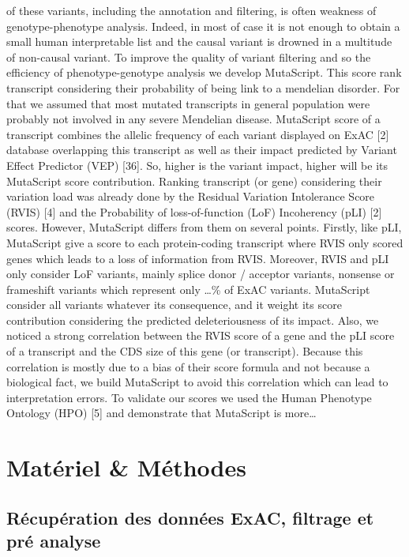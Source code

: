 \documentclass[12pt,twoside]{reedthesis}
\theoremstyle{definition}
\theoremstyle{definition}
\theoremstyle{remark}
\begin{document}
  of these variants, including the annotation and filtering, is often
  weakness of genotype-phenotype analysis. Indeed, in most of case it is
  not enough to obtain a small human interpretable list and the causal
  variant is drowned in a multitude of non-causal variant. To improve the
  quality of variant filtering and so the efficiency of phenotype-genotype
  analysis we develop MutaScript. This score rank transcript considering
  their probability of being link to a mendelian disorder. For that we
  assumed that most mutated transcripts in general population were
  probably not involved in any severe Mendelian disease. MutaScript score
  of a transcript combines the allelic frequency of each variant displayed
  on ExAC {[}2{]} database overlapping this transcript as well as their
  impact predicted by Variant Effect Predictor (VEP) {[}36{]}. So, higher
  is the variant impact, higher will be its MutaScript score contribution.
  Ranking transcript (or gene) considering their variation load was
  already done by the Residual Variation Intolerance Score (RVIS) {[}4{]}
  and the Probability of loss-of-function (LoF) Incoherency (pLI) {[}2{]}
  scores. However, MutaScript differs from them on several points.
  Firstly, like pLI, MutaScript give a score to each protein-coding
  transcript where RVIS only scored genes which leads to a loss of
  information from RVIS. Moreover, RVIS and pLI only consider LoF
  variants, mainly splice donor / acceptor variants, nonsense or
  frameshift variants which represent only \ldots{}\% of ExAC variants.
  MutaScript consider all variants whatever its consequence, and it weight
  its score contribution considering the predicted deleteriousness of its
  impact. Also, we noticed a strong correlation between the RVIS score of
  a gene and the pLI score of a transcript and the CDS size of this gene
  (or transcript). Because this correlation is mostly due to a bias of
  their score formula and not because a biological fact, we build
  MutaScript to avoid this correlation which can lead to interpretation
  errors. To validate our scores we used the Human Phenotype Ontology
  (HPO) {[}5{]} and demonstrate that MutaScript is more\ldots{}
  
  \section{Matériel \& Méthodes}\label{materiel-methodes}
  
  \subsection{Récupération des données ExAC, filtrage et pré
  analyse}\label{recuperation-des-donnees-exac-filtrage-et-pre-analyse}
  
\end{document}
